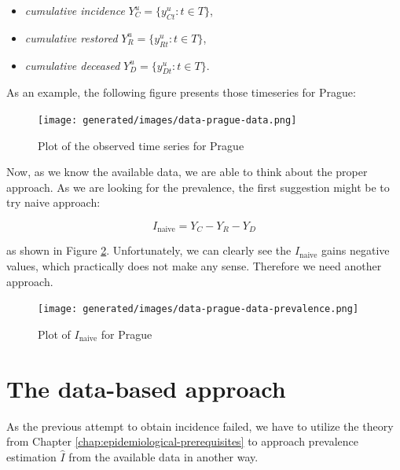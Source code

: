 \documentclass[
  digital, %
  oneside, %
  lof,     %
  lot,     %
]{fithesis4}
\begin{document}
\begin{itemize}
  \item \textit{cumulative incidence} $Y_C^u = \{ y_{Ct}^u : t \in T \}$,
  \item \textit{cumulative restored} $Y_R^u = \{ y_{R t}^u : t \in T \}$,
  \item \textit{cumulative deceased} $Y_D^u = \{ y_{D t}^u : t \in T \}$.
\end{itemize}

As an example, the following figure presents those timeseries for Prague:

\begin{figure}[H]
  \begin{center}
    \texttt{[image: generated/images/data-prague-data.png]}
  \end{center}
  \caption{Plot of the observed time series for Prague}
  \label{fig:data-prague-data}
\end{figure}

Now, as we know the available data, we are able to think about 
the proper approach.
As we are looking for the prevalence, the first suggestion might be to try naive approach:

\begin{equation}\label{eq:data-prevalence-naive}
  I_{\text{naive}} = Y_C - Y_R - Y_D
\end{equation}

\noindent
as shown in Figure \ref{fig:data-prague-data-prevalence}.
Unfortunately, we can clearly see the $I_{\text{naive}}$ gains negative values, which practically does not make any sense.
Therefore we need another approach.

\begin{figure}[H]
  \begin{center}
    \texttt{[image: generated/images/data-prague-data-prevalence.png]}
  \end{center}
  \caption{Plot of $I_{\text{naive}}$ for Prague}
  \label{fig:data-prague-data-prevalence}
\end{figure}


\section{The data-based approach}
\label{sec:data-based-approach}

As the previous attempt to obtain incidence failed, we have to utilize the theory from Chapter \ref{chap:epidemiological-prerequisites} to approach prevalence estimation $\hat{I}$ from the available data in another way.
\end{document}
